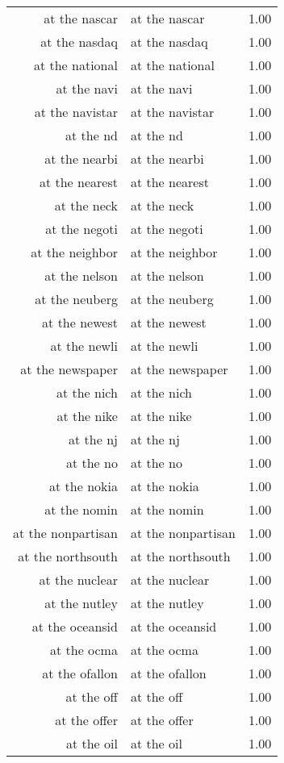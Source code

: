 \begin{table}[ht]
\begin{tabular}{rlr}
  at the nascar & at the nascar & 1.00 \\ 
  at the nasdaq & at the nasdaq & 1.00 \\ 
  at the national & at the national & 1.00 \\ 
  at the navi & at the navi & 1.00 \\ 
  at the navistar & at the navistar & 1.00 \\ 
  at the nd & at the nd & 1.00 \\ 
  at the nearbi & at the nearbi & 1.00 \\ 
  at the nearest & at the nearest & 1.00 \\ 
  at the neck & at the neck & 1.00 \\ 
  at the negoti & at the negoti & 1.00 \\ 
  at the neighbor & at the neighbor & 1.00 \\ 
  at the nelson & at the nelson & 1.00 \\ 
  at the neuberg & at the neuberg & 1.00 \\ 
  at the newest & at the newest & 1.00 \\ 
  at the newli & at the newli & 1.00 \\ 
  at the newspaper & at the newspaper & 1.00 \\ 
  at the nich & at the nich & 1.00 \\ 
  at the nike & at the nike & 1.00 \\ 
  at the nj & at the nj & 1.00 \\ 
  at the no & at the no & 1.00 \\ 
  at the nokia & at the nokia & 1.00 \\ 
  at the nomin & at the nomin & 1.00 \\ 
  at the nonpartisan & at the nonpartisan & 1.00 \\ 
  at the northsouth & at the northsouth & 1.00 \\ 
  at the nuclear & at the nuclear & 1.00 \\ 
  at the nutley & at the nutley & 1.00 \\ 
  at the oceansid & at the oceansid & 1.00 \\ 
  at the ocma & at the ocma & 1.00 \\ 
  at the ofallon & at the ofallon & 1.00 \\ 
  at the off & at the off & 1.00 \\ 
  at the offer & at the offer & 1.00 \\ 
  at the oil & at the oil & 1.00 \\ 

\end{tabular}
\end{table}
